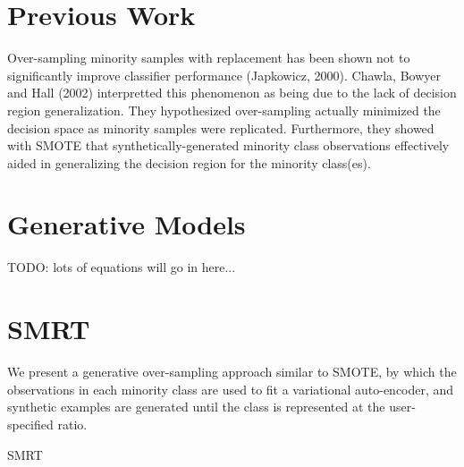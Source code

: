 \documentclass[twoside,11pt]{article}
\begin{document}
\section{Previous Work}

Over-sampling minority samples with replacement has been shown not to significantly improve classifier performance (Japkowicz, 2000).  Chawla, Bowyer and Hall (2002) interpretted this phenomenon as being due to the lack of decision region generalization. They hypothesized over-sampling actually minimized the decision space as minority samples were replicated. Furthermore, they showed with SMOTE that synthetically-generated minority class observations effectively aided in generalizing the decision region for the minority class(es).

\section{Generative Models}

TODO: lots of equations will go in here...

\section{SMRT}

We present a generative over-sampling approach similar to SMOTE, by which the observations in each minority class are used to fit a variational auto-encoder, and synthetic examples are generated until the class is represented at the user-specified ratio. \\

\makeatletter
\def\BState{\State\hskip-\ALG@thistlm}
\makeatother

\begin{algorithm}
\caption{SMRT}\label{smrt}
\end{algorithm}
\end{document}
